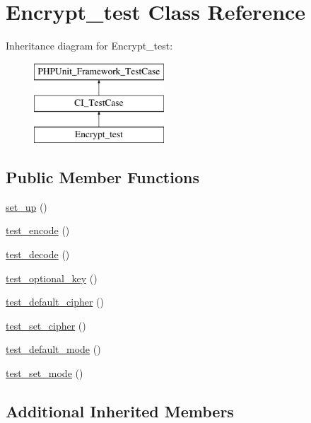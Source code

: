 \hypertarget{class_encrypt__test}{}\section{Encrypt\+\_\+test Class Reference}
\label{class_encrypt__test}
Inheritance diagram for Encrypt\+\_\+test\+:\begin{figure}[H]
\begin{center}
\leavevmode
\includegraphics[height=3.000000cm]{class_encrypt__test}
\end{center}
\end{figure}
\subsection*{Public Member Functions}
\begin{DoxyCompactItemize}
\item 
\hyperlink{class_encrypt__test_a69829875c8d4b6ce94908445c4155741}{set\+\_\+up} ()
\item 
\hyperlink{class_encrypt__test_aff04c35664ab8073770e197802656a93}{test\+\_\+encode} ()
\item 
\hyperlink{class_encrypt__test_a049a4ce2a8d481adc42a14bce4ff535c}{test\+\_\+decode} ()
\item 
\hyperlink{class_encrypt__test_a2658aed9df535723f63339c288b3f435}{test\+\_\+optional\+\_\+key} ()
\item 
\hyperlink{class_encrypt__test_aa93fb36c8d4feb2a12ee88d6ff8013ad}{test\+\_\+default\+\_\+cipher} ()
\item 
\hyperlink{class_encrypt__test_ae79f428e0fce663c8e87c0ba340b09ed}{test\+\_\+set\+\_\+cipher} ()
\item 
\hyperlink{class_encrypt__test_abc501082f6e92774c9e0e34cb36f50aa}{test\+\_\+default\+\_\+mode} ()
\item 
\hyperlink{class_encrypt__test_aff0797365fedc6db77ad1b0eff7ce04e}{test\+\_\+set\+\_\+mode} ()
\end{DoxyCompactItemize}
\subsection*{Additional Inherited Members}


